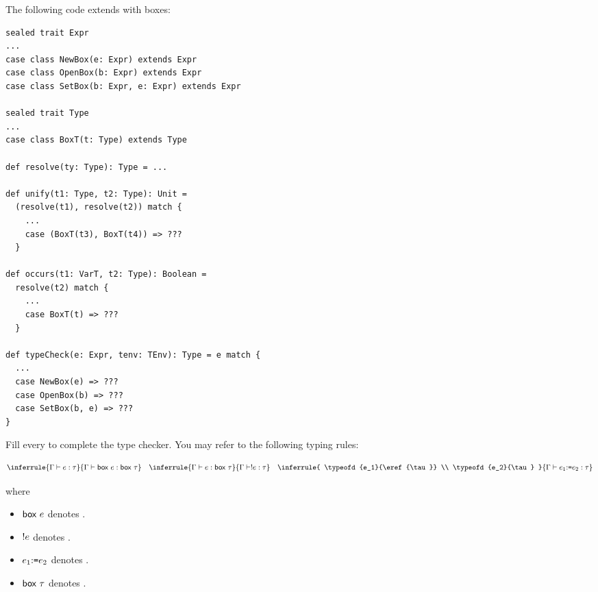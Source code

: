 \begin{exercise}

The following code extends \lang with boxes:
\begin{verbatim}
sealed trait Expr
...
case class NewBox(e: Expr) extends Expr
case class OpenBox(b: Expr) extends Expr
case class SetBox(b: Expr, e: Expr) extends Expr

sealed trait Type
...
case class BoxT(t: Type) extends Type

def resolve(ty: Type): Type = ...

def unify(t1: Type, t2: Type): Unit =
  (resolve(t1), resolve(t2)) match {
    ...
    case (BoxT(t3), BoxT(t4)) => ???
  }

def occurs(t1: VarT, t2: Type): Boolean =
  resolve(t2) match {
    ...
    case BoxT(t) => ???
  }

def typeCheck(e: Expr, tenv: TEnv): Type = e match {
  ...
  case NewBox(e) => ???
  case OpenBox(b) => ???
  case SetBox(b, e) => ???
}
\end{verbatim}

Fill every  to complete the type checker.
You may refer to the following typing rules:

\[
    \inferrule
    { \typeofd{e}{\tau} }
    { \typeofd{\eref{e}}{\eref{\tau}} }
    \quad
    \inferrule
    { \typeofd{e}{\eref{\tau}} }
    { \typeofd{\ederef{e}}{\tau} }
    \quad
    \inferrule
    { \typeofd{e_1}{\eref{\tau}} \\
      \typeofd{e_2}{\tau} }
    { \typeofd{\eset{e_1}{e_2}}{\tau} }
\]

where

\begin{itemize}
  \item $\textsf{box}\ e$ denotes .
  \item $!e$ denotes .
  \item $e_1{:}\texttt{=} e_2$ denotes .
  \item $\textsf{box}\ \tau$ denotes .
\end{itemize}

\end{exercise}


